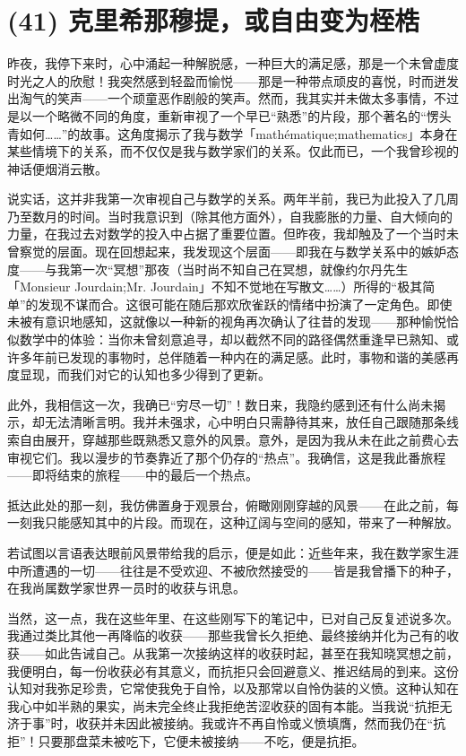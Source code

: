 \section{(41) 克里希那穆提，或自由变为桎梏}

昨夜，我停下来时，心中涌起一种解脱感，一种巨大的满足感，那是一个未曾虚度时光之人的欣慰！我突然感到轻盈而愉悦——那是一种带点顽皮的喜悦，时而迸发出淘气的笑声——一个顽童恶作剧般的笑声。然而，我其实并未做太多事情，不过是以一个略微不同的角度，重新审视了一个早已“熟悉”的片段，那个著名的“愣头青如何……”的故事。这角度揭示了我与数学「mathématique;mathematics」本身在某些情境下的关系，而不仅仅是我与数学家们的关系。仅此而已，一个我曾珍视的神话便烟消云散。

说实话，这并非我第一次审视自己与数学的关系。两年半前，我已为此投入了几周乃至数月的时间。当时我意识到（除其他方面外），自我膨胀的力量、自大倾向的力量，在我过去对数学的投入中占据了重要位置。但昨夜，我却触及了一个当时未曾察觉的层面。现在回想起来，我发现这个层面——即我在与数学关系中的嫉妒态度——与我第一次“冥想”那夜（当时尚不知自己在冥想，就像约尔丹先生「Monsieur Jourdain;Mr. Jourdain」不知不觉地在写散文……）所得的“极其简单”的发现不谋而合。这很可能在随后那欢欣雀跃的情绪中扮演了一定角色。即使未被有意识地感知，这就像以一种新的视角再次确认了往昔的发现——那种愉悦恰似数学中的体验：当你未曾刻意追寻，却以截然不同的路径偶然重逢早已熟知、或许多年前已发现的事物时，总伴随着一种内在的满足感。此时，事物和谐的美感再度显现，而我们对它的认知也多少得到了更新。

此外，我相信这一次，我确已“穷尽一切”！数日来，我隐约感到还有什么尚未揭示，却无法清晰言明。我并未强求，心中明白只需静待其来，放任自己跟随那条线索自由展开，穿越那些既熟悉又意外的风景。意外，是因为我从未在此之前费心去审视它们。我以漫步的节奏靠近了那个仍存的“热点”。我确信，这是我此番旅程——即将结束的旅程——中的最后一个热点。

抵达此处的那一刻，我仿佛置身于观景台，俯瞰刚刚穿越的风景——在此之前，每一刻我只能感知其中的片段。而现在，这种辽阔与空间的感知，带来了一种解放。

若试图以言语表达眼前风景带给我的启示，便是如此：近些年来，我在数学家生涯中所遭遇的一切——往往是不受欢迎、不被欣然接受的——皆是我曾播下的种子，在我尚属数学家世界一员时的收获与讯息。

当然，这一点，我在这些年里、在这些刚写下的笔记中，已对自己反复述说多次。我通过类比其他一再降临的收获——那些我曾长久拒绝、最终接纳并化为己有的收获——如此告诫自己。从我第一次接纳这样的收获时起，甚至在我知晓冥想之前，我便明白，每一份收获必有其意义，而抗拒只会回避意义、推迟结局的到来。这份认知对我弥足珍贵，它常使我免于自怜，以及那常以自怜伪装的义愤。这种认知在我心中如半熟的果实，尚未完全终止我拒绝苦涩收获的固有本能。当我说“抗拒无济于事”时，收获并未因此被接纳。我或许不再自怜或义愤填膺，然而我仍在“抗拒”！只要那盘菜未被吃下，它便未被接纳——不吃，便是抗拒。

